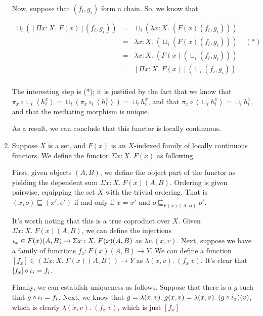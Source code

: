 \documentclass[12pt]{article}
\begin{document}
\begin{enumerate}
Now, suppose that $(f_i,g_i)$ form a chain. So, we know that 

\begin{displaymath}
\begin{array}{lcl}
\sqcup_i ([\Pi x:X.\; F(x)](f_i,g_i)) & = & 
  \sqcup_i (\lambda x:X.\; (F(x) (f_i, g_i))) \\
& = & 
  \lambda x:X.\; (\sqcup_i (F(x) (f_i, g_i))) \;\;\;\;(*) \\
& = & 
  \lambda x:X.\; (F(x) (\sqcup_i (f_i, g_i))) \\
& = & 
[\Pi x:X.\; F(x)] (\sqcup_i (f_i,g_i)) \\
\end{array}
\end{displaymath}

The interesting step is (*); it is justified by the fact
that we know that $\pi_x \circ \sqcup_i \left<h^x_i\right> =  
\sqcup_i (\pi_x \circ_i \left<h^x_i\right>) = 
\sqcup_i h^x_i$, 
and that $\pi_x \circ \left<\sqcup_i h^x_i\right> 
          = \sqcup_i h^x_i$, 
and that the mediating morphism is unique.

As a result, we can conclude that this functor is locally 
continuous.

\item Suppose $X$ is a set, and $F(x)$ is an $X$-indexed family
of locally continuous functors. We define the functor $\Sigma x:X.\;
F(x)$ as following.

First, given objects $(A,B)$, we define the object part of the functor
as yielding the dependent sum $\Sigma x:X.\; F(x)(A,B)$. Ordering is
given pairwise, equipping the set $X$ with the trivial ordering. 
That is $(x,o) \sqsubseteq (x', o')$ if and only if $x = x'$ and 
$o \sqsubseteq_{F(x)(A,B)} o'$. 

It's worth noting that this is a true coproduct over $X$. Given
$\Sigma x:X.\; F(x)(A,B)$, we can define the injections $\iota_{x} \in
F(x)(A,B) \to \Sigma x:X.\; F(x)(A,B)$ as $\lambda v. (x,v)$. 
Next, suppose we have a family of functions $f_x : F(x)(A,B) \to Y$. 
We can define a function $[f_x] \in (\Sigma x:X.\; F(x)(A,B)) \to Y$ as
$\lambda (x,v).\; (f_x\;v)$. It's clear that $[f_x]\circ \iota_{i} = f_i$. 

Finally, we can establish uniqueness as follows. Suppose that there 
is a $g$ such that $g \circ \iota_{i} = f_i$. Next, we know that 
$g = \lambda (x,v).\;g (x, v) = \lambda (x,v).\;(g\circ\iota_{x})(v)$,
which is clearly $\lambda (x,v).\; (f_x\;v)$, which is just $[f_x]$



\end{enumerate}
\end{document}
